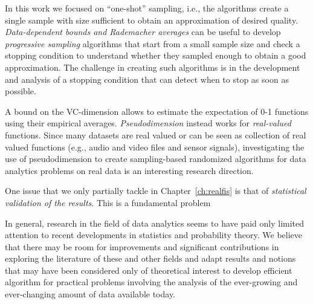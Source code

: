In this work we focused on ``one-shot'' sampling, i.e., the algorithms create a
single sample with size sufficient to obtain an approximation of desired
quality. \emph{Data-dependent bounds and Rademacher averages} can be
useful to develop \emph{progressive sampling} algorithms that start from a small
sample size and check a stopping condition to understand whether they sampled
enough to obtain a good approximation. The challenge in creating such algorithms
is in the development and analysis of a stopping condition that can detect when
to stop as soon as possible.  

A bound on the VC-dimension allows to estimate the expectation of 0-1 functions
using their empirical averages. \emph{Pseudodimension} instead works for \emph{real-valued}
functions. Since many datasets are real valued or can be seen as collection of
real valued functions (e.g., audio and video files and sensor signals),
investigating the use of pseudodimension to create sampling-based randomized
algorithms for data analytics problems on real data is an interesting research
direction.

One issue that we only partially tackle in Chapter~\ref{ch:realfis} is that of
\emph{statistical validation of the results}. This is a fundamental problem


In general, research in the field of data analytics seems to have paid only
limited attention to recent developments in statistics and probability theory. We
believe that there may be room for improvements and significant contributions in
exploring the literature of these and other fields and adapt results and notions
that may have been considered only of theoretical interest to develop efficient
algorithm for practical problems involving the analysis of the ever-growing and
ever-changing amount of data available today.

